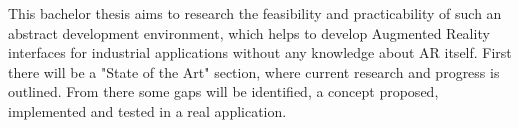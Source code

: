 This bachelor thesis aims to research the feasibility and practicability of such an abstract development environment, which helps to develop Augmented Reality interfaces for industrial applications without any knowledge about AR itself. First there will be a "State of the Art" section, where current research and progress is outlined. From there some gaps will be identified, a concept proposed, implemented and tested in a real application.

























